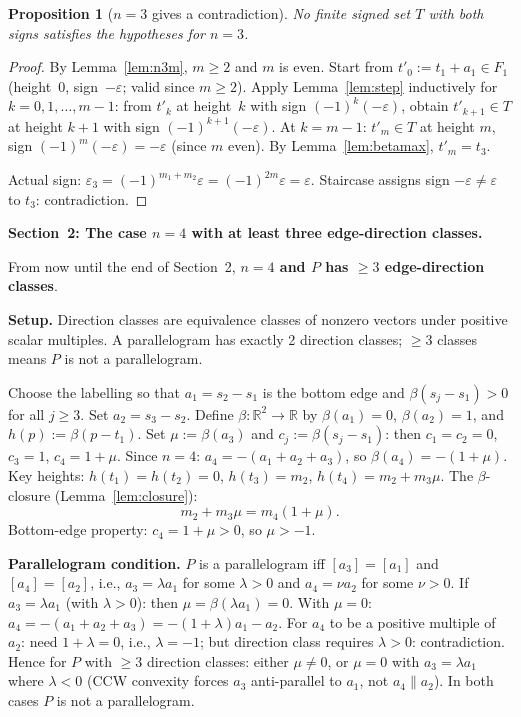 \documentclass{article}
\newtheorem{prop}{Proposition}
\begin{document}
\begin{prop}[$n=3$ gives a contradiction]\label{prop:n3}
No finite signed set $T$ with both signs satisfies the hypotheses for $n=3$.
\end{prop}
\begin{proof}
By Lemma~\ref{lem:n3m}, $m\ge 2$ and $m$ is even.
Start from $t'_0:=t_1+a_1\in F_1$ (height~$0$, sign~$-\varepsilon$; valid since $m\ge 2$).
Apply Lemma~\ref{lem:step} inductively for $k=0,1,\dots,m-1$:
from $t'_k$ at height~$k$ with sign $(-1)^k(-\varepsilon)$,
obtain $t'_{k+1}\in T$ at height $k+1$ with sign $(-1)^{k+1}(-\varepsilon)$.
At $k=m-1$: $t'_m\in T$ at height $m$, sign $(-1)^m(-\varepsilon)=-\varepsilon$ (since $m$ even).
By Lemma~\ref{lem:betamax}, $t'_m=t_3$.

Actual sign: $\varepsilon_3=(-1)^{m_1+m_2}\varepsilon=(-1)^{2m}\varepsilon=\varepsilon$.
Staircase assigns sign $-\varepsilon\ne\varepsilon$ to $t_3$: contradiction.
\end{proof}

\bigskip
\noindent\textbf{Section~2: The case $n=4$ with at least three edge-direction classes.}

From now until the end of Section~2, \textbf{$n=4$ and $P$ has $\ge 3$ edge-direction classes}.

\medskip
\noindent\textbf{Setup.}
Direction classes are equivalence classes of nonzero vectors under positive scalar multiples.
A parallelogram has exactly 2 direction classes; $\ge 3$ classes means $P$ is not a parallelogram.

Choose the labelling so that $a_1=s_2-s_1$ is the bottom edge and
$\beta(s_j-s_1)>0$ for all $j\ge 3$.
Set $a_2=s_3-s_2$.
Define $\beta:\mathbb{R}^2\to\mathbb{R}$ by $\beta(a_1)=0$, $\beta(a_2)=1$,
and $h(p):=\beta(p-t_1)$.
Set $\mu:=\beta(a_3)$ and $c_j:=\beta(s_j-s_1)$: then $c_1=c_2=0$, $c_3=1$, $c_4=1+\mu$.
Since $n=4$: $a_4=-(a_1+a_2+a_3)$, so $\beta(a_4)=-(1+\mu)$.
Key heights: $h(t_1)=h(t_2)=0$, $h(t_3)=m_2$, $h(t_4)=m_2+m_3\mu$.
The $\beta$-closure (Lemma~\ref{lem:closure}):
\begin{equation}\label{eq:closure4}
  m_2+m_3\mu = m_4(1+\mu).
\end{equation}
Bottom-edge property: $c_4=1+\mu>0$, so $\mu>-1$.

\textbf{Parallelogram condition.}
$P$ is a parallelogram iff $[a_3]=[a_1]$ and $[a_4]=[a_2]$, i.e., $a_3=\lambda a_1$ for some
$\lambda>0$ and $a_4=\nu a_2$ for some $\nu>0$.
If $a_3=\lambda a_1$ (with $\lambda>0$): then $\mu=\beta(\lambda a_1)=0$.
With $\mu=0$: $a_4=-(a_1+a_2+a_3)=-(1+\lambda)a_1-a_2$.
For $a_4$ to be a positive multiple of $a_2$: need $1+\lambda=0$, i.e., $\lambda=-1$;
but direction class requires $\lambda>0$: contradiction.
Hence for $P$ with $\ge 3$ direction classes: either $\mu\ne 0$, or $\mu=0$ with $a_3=\lambda a_1$
where $\lambda<0$ (CCW convexity forces $a_3$ anti-parallel to $a_1$, not $a_4\parallel a_2$).
In both cases $P$ is not a parallelogram.
\end{document}
